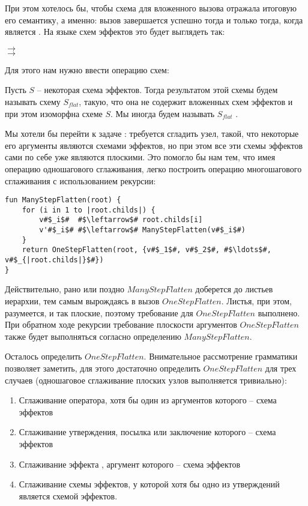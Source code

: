 При этом хотелось бы, чтобы схема для вложенного вызова отражала итоговую его семантику, а именно: вызов завершается успешно тогда и только тогда, когда  является . На языке схем эффектов это будет выглядеть так:

{
     $\rightarrow$  \\
     $\rightarrow$ 
    
}{}

Для этого нам нужно ввести операцию  схем:

\begin{definition}
    Пусть $S$ -- некоторая схема эффектов. Тогда результатом  этой схемы будем называть схему $S_{flat}$, такую, что она не содержит вложенных схем эффектов и при этом изоморфна схеме $S$. Мы иногда будем называть $S_{flat}$ .
\end{definition}

Мы хотели бы перейти к задаче : требуется сгладить узел, такой, что некоторые его аргументы являются схемами эффектов, но при этом все эти схемы эффектов сами по себе уже являются плоскими. Это помогло бы нам тем, что имея операцию одношагового сглаживания, легко построить операцию многошагового сглаживания с использованием рекурсии:

\begin{verbatim}
fun ManyStepFlatten(root) {
    for (i in 1 to |root.childs|) {
        v#$_i$#  #$\leftarrow$# root.childs[i]
        v'#$_i$# #$\leftarrow$# ManyStepFlatten(v#$_i$#) 
    }
    return OneStepFlatten(root, {v#$_1$#, v#$_2$#, #$\ldots$#, v#$_{|root.childs|}$#})
}
\end{verbatim}

Действительно, рано или поздно $ManyStepFlatten$ доберется до листьев иерархии, тем самым вырождаясь в вызов $OneStepFlatten$. Листья, при этом, разумеется, и так плоские, поэтому требование для $OneStepFlatten$ выполнено. При обратном ходе рекурсии требование плоскости аргументов $OneStepFlatten$ также будет выполняться согласно определению $ManyStepFlatten$. 

Осталось определить $OneStepFlatten$. Внимательное рассмотрение грамматики позволяет заметить, для этого достаточно определить $OneStepFlatten$ для трех случаев (одношаговое сглаживание плоских узлов выполняется тривиально):

\begin{enumerate}   
    \item Сглаживание оператора, хотя бы один из аргументов которого -- схема эффектов
    
    \item Сглаживание утверждения, посылка или заключение которого -- схема эффектов
    
    \item Сглаживание эффекта , аргумент которого -- схема эффектов
    
    \item Сглаживание схемы эффектов, у которой хотя бы одно из утверждений является схемой эффектов.
\end{enumerate}

